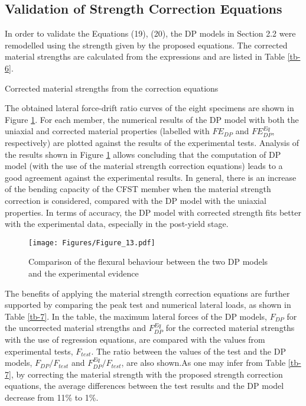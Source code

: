 \documentclass[12pt,a4]{article}
\begin{document}
	\subsection{Validation of Strength Correction Equations}
	In order to validate the Equations (19), (20), the DP models in Section 2.2 were remodelled using the strength given by the proposed equations. The corrected material strengths are calculated from the expressions and are listed in Table \ref{tb-6}.
	\par
	\begin{table}
		\caption{Corrected material strengths from the correction equations}
		\label{tb-6}
	\end{table}
	\par
	The obtained lateral force-drift ratio curves of the eight specimens are shown in Figure \ref{fig-12}. For each member, the numerical results of the DP model with both the uniaxial and corrected material properties (labelled with $FE_{DP}$ and $FE_{DP}^{Eq}$, respectively) are plotted against the results of the experimental tests. Analysis of the results shown in Figure \ref{fig-12} allows concluding that the computation of DP model (with the use of the material strength correction equations) leads to a good agreement against the experimental results. In general, there is an increase of the bending capacity of the CFST member when the material strength correction is considered, compared with the DP model with the uniaxial properties. In terms of accuracy, the DP model with corrected strength fits better with the experimental data, especially in the post-yield stage.
	\par
	\begin{figure}[h]
		\centering
		\texttt{[image: Figures/Figure\_13.pdf]}
		\caption{Comparison of the flexural behaviour between the two DP models and the experimental evidence}
		\label{fig-12}
	\end{figure}
	\par
	The benefits of applying the material strength correction equations are further supported by comparing the peak test and numerical lateral loads, as shown in Table \ref{tb-7}. In the table, the maximum lateral forces of the DP models, $F_{DP}$ for the uncorrected material strengths and $F_{DP}^{Eq}$ for the corrected material strengths with the use of regression equations, are compared with the values from experimental tests, $F_{test}$. The ratio between the values of the test and the DP models, $F_{DP}/F_{test}$ and $F_{DP}^{Eq}/F_{test}$, are also shown.As one may infer from Table \ref{tb-7}, by correcting the material strength with the proposed strength correction equations, the average differences between the test results and the DP model decrease from 11\% to 1\%.
\end{document}
